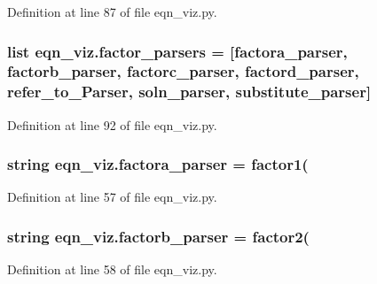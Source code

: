 Definition at line 87 of file eqn\+\_\+viz.\+py.

\hypertarget{namespaceeqn__viz_a87c2b92574d4b106ac2b4a2627a5824b}{}
\subsubsection[{factor\+\_\+parsers}]{\setlength{\rightskip}{0pt plus 5cm}list eqn\+\_\+viz.\+factor\+\_\+parsers = \mbox{[}{\bf factora\+\_\+parser}, {\bf factorb\+\_\+parser}, {\bf factorc\+\_\+parser}, {\bf factord\+\_\+parser}, {\bf refer\+\_\+to\+\_\+\+Parser}, {\bf soln\+\_\+parser}, {\bf substitute\+\_\+parser}\mbox{]}}\label{namespaceeqn__viz_a87c2b92574d4b106ac2b4a2627a5824b}


Definition at line 92 of file eqn\+\_\+viz.\+py.

\hypertarget{namespaceeqn__viz_a854e9036019062010a0620dca4adcf5f}{}
\subsubsection[{factora\+\_\+parser}]{\setlength{\rightskip}{0pt plus 5cm}string eqn\+\_\+viz.\+factora\+\_\+parser = \textquotesingle{}factor1(\textquotesingle{}}\label{namespaceeqn__viz_a854e9036019062010a0620dca4adcf5f}


Definition at line 57 of file eqn\+\_\+viz.\+py.

\hypertarget{namespaceeqn__viz_a830b341130da6861c90efd9ac0858486}{}
\subsubsection[{factorb\+\_\+parser}]{\setlength{\rightskip}{0pt plus 5cm}string eqn\+\_\+viz.\+factorb\+\_\+parser = \textquotesingle{}factor2(\textquotesingle{}}\label{namespaceeqn__viz_a830b341130da6861c90efd9ac0858486}


Definition at line 58 of file eqn\+\_\+viz.\+py.

\hypertarget{namespaceeqn__viz_addfe6dbd1f7e4817decc2f392291d743}{}
